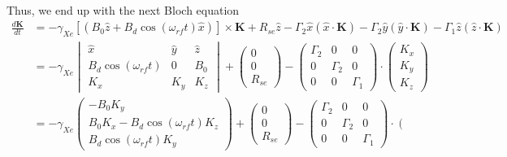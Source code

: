 \documentclass{article}
\begin{document}
Thus, we end up with the next Bloch equation
\begin{align}
    \frac{d \mathbf{K}}{d t} &= -\gamma_{Xe}\left[\left( B_0\hat{z} + B_d \cos{(\omega_{rf} t)}\hat{x}\right) \right] \times\mathbf{K}  +R_{se}\hat{z} - \Gamma_2 \hat{x}\left(\hat{x}\cdot \mathbf{K}\right)  - \Gamma_2 \hat{y}\left(\hat{y}\cdot \mathbf{K}\right) -  \Gamma_1 \hat{z}\left(\hat{z}\cdot \mathbf{K}\right)\\
    &= -\gamma_{Xe} \begin{vmatrix}
        \hat{x}                     & \hat{y}       & \hat{z} \\
         B_d\cos{(\omega_{rf} t)}   & 0             & B_0  \\
         K_x                        & K_y           & K_z
    \end{vmatrix} + 
    \left(\begin{matrix}
         0  \\
         0  \\
         R_{se} 
    \end{matrix}\right) - 
    \left(\begin{matrix}
    \Gamma_2  &  0  &0\\
    0  &  \Gamma_2  &  0\\
    0  &  0  &  \Gamma_1 
    \end{matrix}\right)\cdot
    \left(\begin{matrix}
    K_x\\
    K_y\\
    K_z
    \end{matrix}\right)\\
    &= - \gamma_{Xe} 
    \left(\begin{matrix}
    -B_0 K_y\\
    B_0 K_x - B_d \cos{(\omega_{rf} t)} K_z\\
    B_d \cos{(\omega_{rf} t)} K_y
    \end{matrix}\right) + 
    \left(\begin{matrix}
         0  \\
         0  \\
         R_{se} 
    \end{matrix}\right) - 
    \left(\begin{matrix}
    \Gamma_2  &  0  &0\\
    0  &  \Gamma_2  &  0\\
    0  &  0  &  \Gamma_1 
    \end{matrix}\right)\cdot
    \left(\begin{matrix}

\end{matrix}
\end{align}
\end{document}
